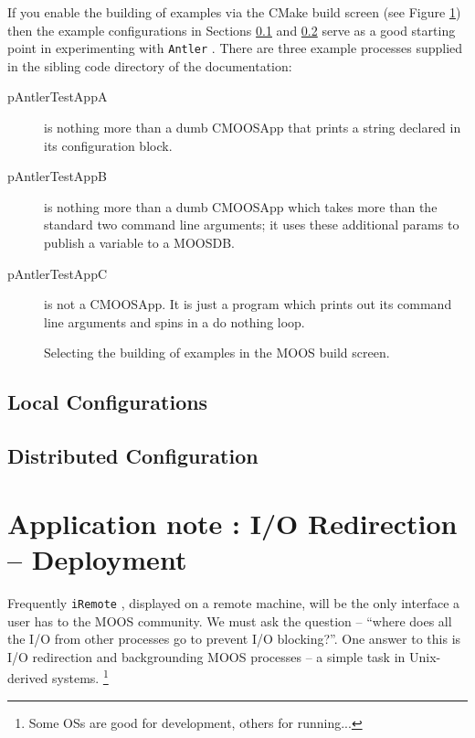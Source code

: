 \documentclass[a4paper,10pt]{article}
\newcommand{\Code}[1]{\texttt{#1} }
\newcommand{\code}[1]{\Code{#1} }
\begin{document}
If you enable the building of examples via the CMake build screen (see Figure \ref{Fig:Build}) then the example configurations in Sections \ref{Sec:Local} and \ref{Sec:Distrib} serve as a good starting point in experimenting with \code{Antler}.  There are three example processes supplied in the sibling code directory of the documentation:

\begin{description}
\item [pAntlerTestAppA] is nothing more than a dumb CMOOSApp that prints a string declared in its configuration block.
\item [pAntlerTestAppB] is nothing more than a dumb CMOOSApp which takes more than the standard two command line arguments; it uses these additional params to publish a variable to a MOOSDB.
\item [pAntlerTestAppC] is not a CMOOSApp. It is just a program which prints out its command line arguments and spins in a do nothing loop.
\
\end{description}

\begin{figure}\label{Fig:Build}
\centering
{}
\caption{Selecting the building of examples in the MOOS build screen.}
\end{figure}


\subsection{Local Configurations}\label{Sec:Local}




\subsection{Distributed Configuration}\label{Sec:Distrib}



\section{Application note : I/O Redirection -- Deployment}
Frequently \code{iRemote}, displayed on a remote machine, will be
the only interface a user has to the MOOS community.  We
must ask the question --  ``where does all the I/O from other
processes go to prevent I/O blocking?''. One answer to this is I/O
redirection and backgrounding MOOS processes -- a simple task in
Unix-derived systems. \footnote{Some OSs are good for development,
others for running...}
\end{document}
